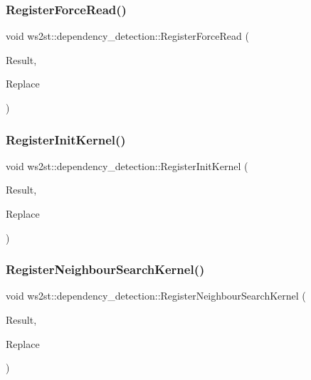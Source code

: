 \subsubsection{\texorpdfstring{Register\+Force\+Read()}{RegisterForceRead()}}
{\footnotesize\ttfamily void ws2st\+::dependency\+\_\+detection\+::\+Register\+Force\+Read (\begin{DoxyParamCaption}\item[{const Match\+Finder\+::\+Match\+Result \&}]{Result,  }\item[{Replacements \&}]{Replace }\end{DoxyParamCaption})}

\mbox{\label{namespacews2st_1_1dependency__detection_ae32a6dbe890421b635bdb1a91728a7fb}} 
\subsubsection{\texorpdfstring{Register\+Init\+Kernel()}{RegisterInitKernel()}}
{\footnotesize\ttfamily void ws2st\+::dependency\+\_\+detection\+::\+Register\+Init\+Kernel (\begin{DoxyParamCaption}\item[{const Match\+Finder\+::\+Match\+Result \&}]{Result,  }\item[{Replacements \&}]{Replace }\end{DoxyParamCaption})}

\mbox{\label{namespacews2st_1_1dependency__detection_a248d3b13235071779b21013154238667}} 
\subsubsection{\texorpdfstring{Register\+Neighbour\+Search\+Kernel()}{RegisterNeighbourSearchKernel()}}
{\footnotesize\ttfamily void ws2st\+::dependency\+\_\+detection\+::\+Register\+Neighbour\+Search\+Kernel (\begin{DoxyParamCaption}\item[{const Match\+Finder\+::\+Match\+Result \&}]{Result,  }\item[{Replacements \&}]{Replace }\end{DoxyParamCaption})}

